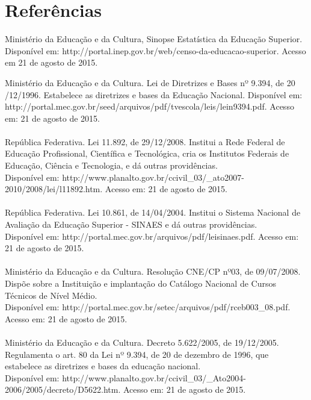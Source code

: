 \section{Referências}
\begin{flushleft}
Ministério da Educação e da Cultura, Sinopse Estatística da Educação Superior.
Disponível em: http://portal.inep.gov.br/web/censo-da-educacao-superior. Acesso em 21 de agosto de 2015.
\end{flushleft}
\vspace{4mm}
Ministério da Educação e da Cultura. Lei de Diretrizes e Bases nº 9.394, de 20 /12/1996. Estabelece as diretrizes e bases da Educação Nacional. Disponível em:\\ http://portal.mec.gov.br/seed/arquivos/pdf/tvescola/leis/lein9394.pdf. Acesso em: 21 de agosto de 2015.
\\
\\
República Federativa. Lei 11.892, de 29/12/2008. Institui a Rede Federal de Educação Profissional, Científica e Tecnológica, cria os Institutos Federais de Educação, Ciência e Tecnologia, e dá outras providências.\\
Disponível em: http://www.planalto.gov.br/ccivil\_03/\_ato2007-2010/2008/lei/l11892.htm. Acesso em: 21 de agosto de 2015.
\\
\\
República Federativa. Lei 10.861, de 14/04/2004. Institui o Sistema Nacional de Avaliação da Educação Superior - SINAES e dá outras providências.\\
Disponível em: http://portal.mec.gov.br/arquivos/pdf/leisinaes.pdf.
Acesso em: 21 de agosto de 2015.
\\
\\
Ministério da Educação e da Cultura. Resolução CNE/CP nº03, de 09/07/2008. Dispõe sobre a Instituição e implantação do Catálogo Nacional de Cursos Técnicos de Nível Médio.\\
Disponível em: http://portal.mec.gov.br/setec/arquivos/pdf/rceb003\_08.pdf.
Acesso em: 21 de agosto de 2015.
\\
\\
Ministério da Educação e da Cultura. Decreto 5.622/2005, de 19/12/2005. Regulamenta o art. 80 da Lei nº 9.394, de 20 de dezembro de 1996, que estabelece as diretrizes e bases da educação nacional.\\ 
Disponível em: http://www.planalto.gov.br/ccivil\_03/\_Ato2004-2006/2005/decreto/D5622.htm. Acesso em: 21 de agosto de 2015.
\\
\\
